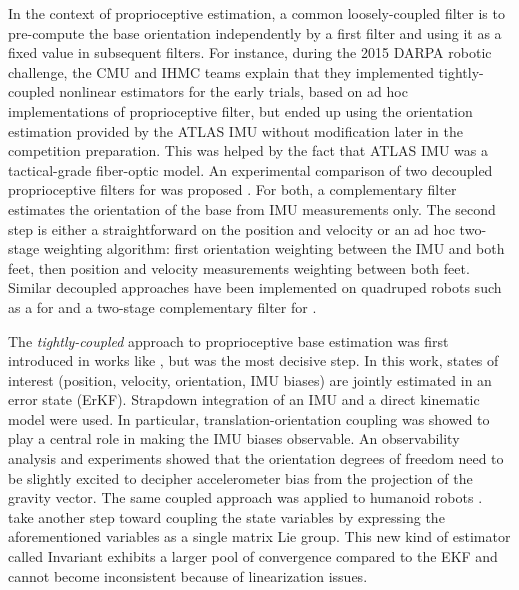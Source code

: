 In the context of proprioceptive estimation, a common loosely-coupled filter is to pre-compute the base orientation independently by a first filter and using it as a fixed value in subsequent filters. For instance, during the 2015 DARPA robotic challenge, the CMU \cite{feng2015optimization} and IHMC 
\cite{johnson2015team} teams explain that they implemented tightly-coupled nonlinear estimators for the early trials, based on ad hoc 
implementations of proprioceptive filter, but ended up using the orientation estimation provided by the ATLAS IMU without modification later in the competition preparation.
This was helped by the fact that ATLAS IMU was a tactical-grade fiber-optic model. 
An experimental comparison of two decoupled proprioceptive filters for  was proposed \cite{flayols2017experimental}. For both, a complementary filter estimates 
the orientation of the base from IMU measurements only. The second step is either a straightforward \KalmanF on the position and velocity or an ad hoc two-stage 
weighting algorithm: first orientation weighting between the IMU and both feet, then position and velocity measurements 
weighting between both feet. Similar decoupled approaches have been implemented on quadruped robots such as a \KalmanF for \cite{bledt2018cheetah} and a two-stage complementary filter for \cite{leziart2021implementation}.

The \textit{tightly-coupled} approach to proprioceptive base estimation was first introduced in works like \cite{chilian2011multisensor}, but \cite{bloesch2013state} was the most decisive step.
In this work, states of interest (position, velocity, orientation, IMU biases) are jointly estimated in an error state \KalmanF (ErKF). Strapdown integration of an IMU and 
a direct kinematic model were used. In particular, translation-orientation coupling was showed to play a central role in making the IMU biases observable. 
An observability analysis and experiments showed that the orientation degrees of freedom need to be slightly excited to decipher accelerometer bias from the projection of the 
gravity vector. The same coupled approach was applied to humanoid robots \cite{rotella2014state, fallon2014drift}.
\cite{hartley2020contact, lin2021deep} take another step toward coupling the state variables by expressing the aforementioned variables as a single matrix Lie group.
This new kind of estimator called Invariant \KalmanF \cite{barrau2018invariant} exhibits a larger pool of convergence compared to the EKF and cannot become 
inconsistent because of linearization issues. 

